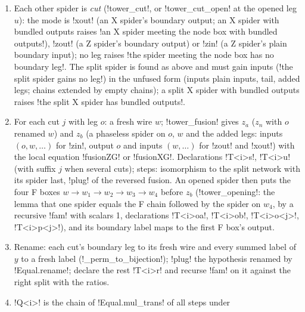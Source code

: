 {{{\begin{algorithm}
\begin{enumerate}
with plain chains, else \lexcode!the split spider's legs are not the unfused form!) are fused along
the joining label (\lexpy!tower_fuse!: \lexlean!fusionZG! or \lexlean!fusionXG!), and the fused spider
is unfused into $z_n$ and $z_m$'s split with the added legs. Declarations
\lexlean!T<i>m<j>a! to \lexlean!T<i>m<j>d!; steps: isomorphism, \lexlean!plug! of the fusion,
isomorphism, \lexlean!plug! of the reversed fusion.
\item Each other spider is \emph{cut} (\lexpy!tower_cut!, or \lexpy!tower_cut_open! at the opened leg
$u$): the mode is \lexcode!xout! (an X spider's boundary output; an X spider with bundled outputs
raises \lexcode!an X spider meeting the node box with bundled outputs!), \lexcode!zout! (a Z spider's
boundary output) or \lexcode!zin! (a Z spider's plain boundary input); no leg raises
\lexcode!the spider meeting the node box has no boundary leg!. The split spider is found as above
and must gain inputs (\lexcode!the split spider gains no leg!) in the unfused form (inputs plain
inputs, tail, added legs; chains extended by empty chains); a split X spider with bundled
outputs raises \lexcode!the split X spider has bundled outputs!.
\item For each cut $j$ with leg $o$: a fresh wire $w$; \lexpy!tower_fusion! gives $z_a$ ($z_n$ with
$o$ renamed $w$) and $z_b$ (a phaseless spider on $o$, $w$ and the added legs: inputs
$(o, w, \ldots)$ for \lexcode!zin!, output $o$ and inputs $(w, \ldots)$ for \lexcode!zout! and
\lexcode!xout!) with the local equation \lexlean!fusionZG! or \lexlean!fusionXG!. Declarations
\lexlean!T<i>s!, \lexlean!T<i>u! (with suffix $j$ when several cuts); steps: isomorphism to the split
network with its spider last, \lexlean!plug! of the reversed fusion. An opened spider then puts
the four F boxes $w \to w_1 \to w_2 \to w_3 \to w_4$ before $z_b$ (\lexpy!tower_opening!: the
lemma that one spider equals the F chain followed by the spider on $w_4$, by a recursive
\lexpy!fam! with scalars 1, declarations \lexlean!T<i>oa!, \lexlean!T<i>ob!, \lexlean!T<i>o<j>!,
\lexlean!T<i>p<j>!), and its boundary label maps to the first F box's output.
\item Rename: each cut's boundary leg to its fresh wire and every summed label of $y$ to a fresh
label (\lexpy!_perm_to_bijection!); \lexlean!plug! the hypothesis renamed by \lexlean!Equal.rename!;
declare the rest \lexlean!T<i>r! and recurse \lexpy!fam! on it against the right split with the
ratios.
\item \lexlean!Q<i>! is the chain of \lexlean!Equal.mul_trans! of all steps under

\end{enumerate}
\end{algorithm}}}}
